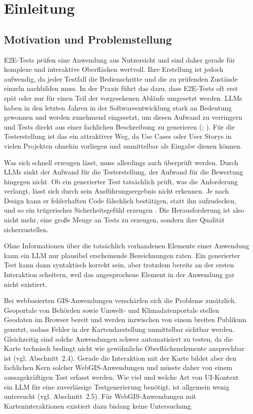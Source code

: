 \section{Einleitung}

\subsection{Motivation und Problemstellung}

\ac{E2E}-Tests prüfen eine Anwendung aus Nutzersicht und sind daher gerade für komplexe und interaktive Oberflächen wertvoll. Ihre Erstellung ist jedoch aufwendig, da jeder Testfall die Bedienschritte und die zu prüfenden Zustände einzeln nachbilden muss. In der Praxis führt das dazu, dass \ac{E2E}-Tests oft erst spät oder nur für einen Teil der vorgesehenen Abläufe umgesetzt werden. \acp{LLM} haben in den letzten Jahren in der Softwareentwicklung stark an Bedeutung gewonnen und werden zunehmend eingesetzt, um diesen Aufwand zu verringern und Tests direkt aus einer fachlichen Beschreibung zu generieren (\cite[S.~1]{hou_large_2024}; \cite[S.~1]{ferreira_acceptance_2025}). Für die Testerstellung ist das ein attraktiver Weg, da Use Cases oder User Storys in vielen Projekten ohnehin vorliegen und unmittelbar als Eingabe dienen können.

Was sich schnell erzeugen lässt, muss allerdings auch überprüft werden. Durch \acp{LLM} sinkt der Aufwand für die Testerstellung, der Aufwand für die Bewertung hingegen nicht. Ob ein generierter Test tatsächlich prüft, was die Anforderung verlangt, lässt sich durch sein Ausführungsergebnis nicht erkennen. Je nach Design kann er fehlerhaften Code fälschlich bestätigen, statt ihn aufzudecken, und so ein trügerisches Sicherheitsgefühl erzeugen \parencite[S.~5]{mathews_design_2024}. Die Herausforderung ist also nicht mehr, eine große Menge an Tests zu erzeugen, sondern ihre Qualität sicherzustellen.

Ohne Informationen über die tatsächlich vorhandenen Elemente einer Anwendung kann ein \ac{LLM} nur plausibel erscheinende Bezeichnungen raten. Ein generierter Test kann dann syntaktisch korrekt sein, aber trotzdem bereits an der ersten Interaktion scheitern, weil das angesprochene Element in der Anwendung gar nicht existiert.

Bei webbasierten \ac{GIS}-Anwendungen verschärfen sich die Probleme zusätzlich. Geoportale von Behörden sowie Umwelt- und Klimadatenportale stellen Geodaten im Browser bereit und werden inzwischen von einem breiten Publikum genutzt, sodass Fehler in der Kartendarstellung unmittelbar sichtbar werden. Gleichzeitig sind solche Anwendungen schwer automatisiert zu testen, da die Karte technisch bedingt nicht wie gewöhnliche Oberflächenelemente ansprechbar ist (vgl. Abschnitt~2.4). Gerade die Interaktion mit der Karte bildet aber den fachlichen Kern solcher WebGIS-Anwendungen und müsste daher von einem aussagekräftigen Test erfasst werden. Wie viel und welche Art von \ac{UI}-Kontext ein \ac{LLM} für eine zuverlässige Testgenerierung benötigt, ist allgemein wenig untersucht (vgl. Abschnitt~2.5). Für WebGIS-Anwendungen mit Karteninteraktionen existiert dazu bislang keine Untersuchung.

